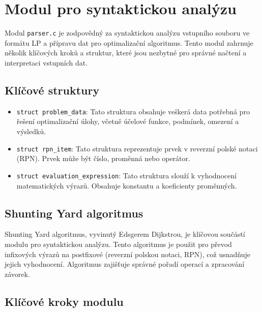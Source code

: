 \documentclass[czech, sem, kiv, he, pdf, viewonly]{fasthesis}
\begin{document}
\section{Modul pro syntaktickou analýzu}

Modul \texttt{parser.c} je zodpovědný za syntaktickou analýzu vstupního souboru ve formátu LP a přípravu dat pro optimalizační algoritmus. Tento modul zahrnuje několik klíčových kroků a struktur, které jsou nezbytné pro správné načtení a interpretaci vstupních dat.

\subsection{Klíčové struktury}

\begin{itemize}
    \item \texttt{struct problem\_data}: Tato struktura obsahuje veškerá data potřebná pro řešení optimalizační úlohy, včetně účelové funkce, podmínek, omezení a výsledků.
    \item \texttt{struct rpn\_item}: Tato struktura reprezentuje prvek v reverzní polské notaci (RPN). Prvek může být číslo, proměnná nebo operátor.
    \item \texttt{struct evaluation\_expression}: Tato struktura slouží k vyhodnocení matematických výrazů. Obsahuje konstantu a koeficienty proměnných.
\end{itemize}

\subsection{Shunting Yard algoritmus}

Shunting Yard algoritmus, vyvinutý Edsgerem Dijkstrou, je klíčovou součástí modulu pro syntaktickou analýzu. Tento algoritmus je použit pro převod infixových výrazů na postfixové (reverzní polskou notaci, RPN), což usnadňuje jejich vyhodnocení. Algoritmus zajišťuje správné pořadí operací a zpracování závorek.

\subsection{Klíčové kroky modulu}
\end{document}
